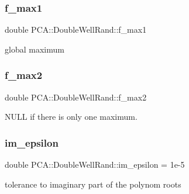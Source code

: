 \subsubsection{\texorpdfstring{f\+\_\+max1}{f\_max1}}
{\footnotesize\ttfamily double P\+C\+A\+::\+Double\+Well\+Rand\+::f\+\_\+max1\hspace{0.3cm}{\ttfamily [private]}}



global maximum 

\hypertarget{class_p_c_a_1_1_double_well_rand_a05278693e04d00a31bd41dedb38926b7}{}\label{class_p_c_a_1_1_double_well_rand_a05278693e04d00a31bd41dedb38926b7} 
\subsubsection{\texorpdfstring{f\+\_\+max2}{f\_max2}}
{\footnotesize\ttfamily double P\+C\+A\+::\+Double\+Well\+Rand\+::f\+\_\+max2\hspace{0.3cm}{\ttfamily [private]}}



N\+U\+LL if there is only one maximum. 

\hypertarget{class_p_c_a_1_1_double_well_rand_a5fa2e0c609851d3e8a8cb9eb4bbd90c6}{}\label{class_p_c_a_1_1_double_well_rand_a5fa2e0c609851d3e8a8cb9eb4bbd90c6} 
\subsubsection{\texorpdfstring{im\+\_\+epsilon}{im\_epsilon}}
{\footnotesize\ttfamily double P\+C\+A\+::\+Double\+Well\+Rand\+::im\+\_\+epsilon = 1e-\/5\hspace{0.3cm}{\ttfamily [private]}}



tolerance to imaginary part of the polynom roots 

\hypertarget{class_p_c_a_1_1_double_well_rand_a4792680466fc8f865be362937b3e4e3b}{}\label{class_p_c_a_1_1_double_well_rand_a4792680466fc8f865be362937b3e4e3b} 
